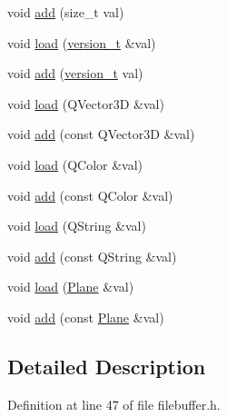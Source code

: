 \begin{DoxyCompactItemize}
\item 
void \hyperlink{classShipCAD_1_1FileBuffer_aa22983fa24559f6d0d119d89036100af}{add} (size\-\_\-t val)
\item 
void \hyperlink{classShipCAD_1_1FileBuffer_a20977e9b9504c3c5f4cb32adf9ef4659}{load} (\hyperlink{namespaceShipCAD_af3a6fa23a7318acbda7b0066b53d694f}{version\-\_\-t} \&val)
\item 
void \hyperlink{classShipCAD_1_1FileBuffer_a02d5339844191112062d92c9ac74ec96}{add} (\hyperlink{namespaceShipCAD_af3a6fa23a7318acbda7b0066b53d694f}{version\-\_\-t} val)
\item 
void \hyperlink{classShipCAD_1_1FileBuffer_a7255342a053689ebafda9317cc586c57}{load} (Q\-Vector3\-D \&val)
\item 
void \hyperlink{classShipCAD_1_1FileBuffer_a0642733d14682981c12f6aeaef9bb884}{add} (const Q\-Vector3\-D \&val)
\item 
void \hyperlink{classShipCAD_1_1FileBuffer_a3329cf81740c79967acc24bc0ac3c9a3}{load} (Q\-Color \&val)
\item 
void \hyperlink{classShipCAD_1_1FileBuffer_a3611327a77cc938e987ecda018d0d936}{add} (const Q\-Color \&val)
\item 
void \hyperlink{classShipCAD_1_1FileBuffer_a82c790d09c8e85c0f9d218efd9c93605}{load} (Q\-String \&val)
\item 
void \hyperlink{classShipCAD_1_1FileBuffer_aea305be34bc316cc5b849fb291499012}{add} (const Q\-String \&val)
\item 
void \hyperlink{classShipCAD_1_1FileBuffer_a4ae77da0ea26a1ed6de262ff7f3d606f}{load} (\hyperlink{classShipCAD_1_1Plane}{Plane} \&val)
\item 
void \hyperlink{classShipCAD_1_1FileBuffer_ae947c5bac13749a8b0d833bfa7979d0d}{add} (const \hyperlink{classShipCAD_1_1Plane}{Plane} \&val)
\end{DoxyCompactItemize}


\subsection{Detailed Description}


Definition at line 47 of file filebuffer.\-h.



